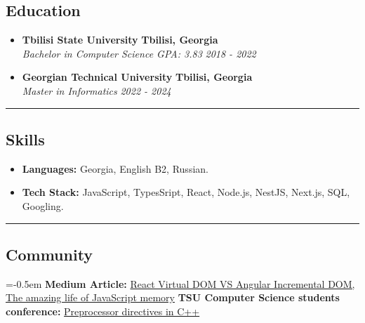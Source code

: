 \documentclass[10pt,letterpaper]{article}
\begin{document}
\subsection*{Education}
  \begin{itemize}
    \parskip=1em
      \vspace{0.05em}

    \item[]
    {\textbf{Tbilisi State University}}
     \hfill
     \textbf{Tbilisi, Georgia}
    \\
    {\emph{Bachelor in Computer Science GPA: 3.83}
     \hfill
     \emph{2018 - 2022}}

    \item[]
    {\textbf{Georgian Technical University}}
     \hfill
     \textbf{Tbilisi, Georgia}
    \\
    {\emph{Master in Informatics}
     \hfill
     \emph{2022 - 2024}}
  \end{itemize}

\hrule
\vspace{-1.0em}
\subsection*{Skills}
\begin{itemize}
  \parskip=-0.5em
  \vspace{0.05em}
  \item[] \textbf{Languages:} Georgia, English B2, Russian.
  \vspace{0.5em}
  \item[] \textbf{Tech Stack:} JavaScript, TypesSript, React, Node.js, NestJS, Next.js, SQL, Googling.
\end{itemize}

\hrule
\vspace{-1.0em}
\subsection*{Community}
\begin{itemize}
  \parskip=-0.5em
  \vspace{0.05em}
  \newline \textbf {Medium Article:} \href {https://medium.com/@giorgi-dogadze/%E1%83%A0%E1%83%90-%E1%83%90%E1%83%A0%E1%83%98%E1%83%A1-react-virtual-dom-%E1%83%93%E1%83%90-angular-incremental-dom-dec1488d5393} {React Virtual DOM VS Angular Incremental DOM, } \href {https://medium.com/@giorgi-dogadze/the-amazing-life-of-javascript-memory-%E1%83%90%E1%83%9C%E1%83%A3-%E1%83%A2%E1%83%98%E1%83%90%E1%83%9C%E1%83%A8%E1%83%90%E1%83%9C%E1%83%98-9183e20b6cfd} {The amazing life of JavaScript memory}
  \vspace{0.05em}
  \newline \textbf {TSU Computer Science students conference:} \href {https://computing.tsu.ge/ka/news/15} {Preprocessor directives in C++}
  
\end{itemize}
\end{document}
